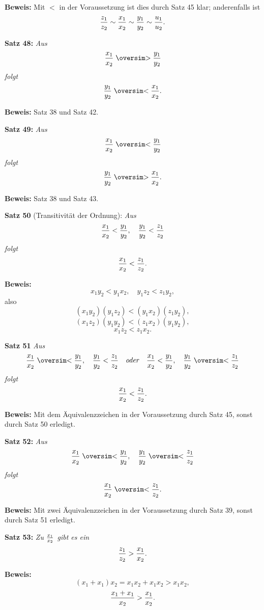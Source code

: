 {\bf Beweis:} Mit $<$ in der Voraussetzung ist dies durch Satz 45
klar; anderenfalls ist
$${z_1 \over z_2} \sim {x_1 \over x_2} \sim {y_1 \over y_2} \sim {u_1 \over u_2}.$$
\medskip


{\bf Satz 48:} {\it Aus
$${x_1 \over x_2} \gesim {y_1 \over y_2}$$
folgt
$${y_1 \over y_2} \lesim {x_1 \over x_2}.$$}%

{\bf Beweis:} Satz 38 und Satz 42.
\medskip


{\bf Satz 49:} {\it Aus
$${x_1 \over x_2} \lesim {y_1 \over y_2}$$
folgt
$${y_1 \over y_2} \gesim {x_1 \over x_2}.$$}%

{\bf Beweis:} Satz 38 und Satz 43.
\medskip


{\bf Satz 50} (Transitivit\"at der Ordnung): {\it Aus
$${x_1 \over x_2} < {y_1 \over y_2},\quad {y_1 \over y_2} < {z_1 \over z_2}$$
folgt
$${x_1 \over x_2} < {z_1 \over z_2}.$$}%

{\bf Beweis:} $$x_1 y_2 < y_1 x_2,\quad y_1 z_2 < z_1 y_2,$$
also
$$(x_1 y_2)(y_1 z_2) < (y_1 x_2)(z_1 y_2),$$
$$(x_1 z_2)(y_1 y_2) < (z_1 x_2)(y_1 y_2),$$
$$x_1 z_2 < z_1 x_2.$$
\medskip


{\bf Satz 51} {\it Aus
$${x_1 \over x_2} \lesim {y_1 \over y_2},\quad {y_1 \over y_2} < {z_1 \over z_2}\quad{\it oder}\quad{x_1 \over x_2} < {y_1 \over y_2},\quad {y_1 \over y_2} \lesim {z_1 \over z_2}$$
folgt
$${x_1 \over x_2} < {z_1 \over z_2}.$$}%

{\bf Beweis:} Mit dem \"Aquivalenzzeichen in der Voraussetzung
durch Satz 45, sonst durch Satz 50 erledigt.
\medskip


{\bf Satz 52:} {\it Aus
$${x_1 \over x_2} \lesim {y_1 \over y_2},\quad {y_1 \over y_2} \lesim {z_1 \over z_2}$$
folgt
$${x_1 \over x_2} \lesim {z_1 \over z_2}.$$}%

{\bf Beweis:} Mit zwei \"Aquivalenzzeichen in der Voraussetzung
durch Satz 39, sonst durch Satz 51 erledigt.
\medskip


{\bf Satz 53:} {\it Zu $x_1 \over x_2$ gibt es ein
$${z_1 \over z_2} > {x_1 \over x_2}.$$}%

{\bf Beweis:} $$(x_1 + x_1) x_2 = x_1 x_2 + x_1 x_2 > x_1 x_2,$$
$${x_1 + x_1 \over x_2} > {x_1 \over x_2}.$$
\medskip

